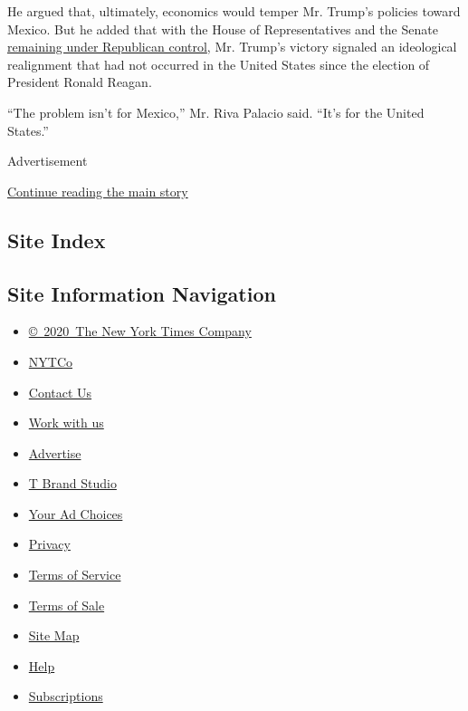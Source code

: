 He argued that, ultimately, economics would temper Mr. Trump's policies
toward Mexico. But he added that with the House of Representatives and
the Senate
\href{http://www.nytimes3xbfgragh.onion/2016/11/09/us/politics/republican-senate.html?action=Click\&contentCollection=BreakingNews\&contentID=64523551\&pgtype=article}{remaining
under Republican control}, Mr. Trump's victory signaled an ideological
realignment that had not occurred in the United States since the
election of President Ronald Reagan.

``The problem isn't for Mexico,'' Mr. Riva Palacio said. ``It's for the
United States.''

Advertisement

\protect\hyperlink{after-bottom}{Continue reading the main story}

\hypertarget{site-index}{%
\subsection{Site Index}\label{site-index}}

\hypertarget{site-information-navigation}{%
\subsection{Site Information
Navigation}\label{site-information-navigation}}

\begin{itemize}
\tightlist
\item
  \href{https://help.nytimes3xbfgragh.onion/hc/en-us/articles/115014792127-Copyright-notice}{©~2020~The
  New York Times Company}
\end{itemize}

\begin{itemize}
\tightlist
\item
  \href{https://www.nytco.com/}{NYTCo}
\item
  \href{https://help.nytimes3xbfgragh.onion/hc/en-us/articles/115015385887-Contact-Us}{Contact
  Us}
\item
  \href{https://www.nytco.com/careers/}{Work with us}
\item
  \href{https://nytmediakit.com/}{Advertise}
\item
  \href{http://www.tbrandstudio.com/}{T Brand Studio}
\item
  \href{https://www.nytimes3xbfgragh.onion/privacy/cookie-policy\#how-do-i-manage-trackers}{Your
  Ad Choices}
\item
  \href{https://www.nytimes3xbfgragh.onion/privacy}{Privacy}
\item
  \href{https://help.nytimes3xbfgragh.onion/hc/en-us/articles/115014893428-Terms-of-service}{Terms
  of Service}
\item
  \href{https://help.nytimes3xbfgragh.onion/hc/en-us/articles/115014893968-Terms-of-sale}{Terms
  of Sale}
\item
  \href{https://spiderbites.nytimes3xbfgragh.onion}{Site Map}
\item
  \href{https://help.nytimes3xbfgragh.onion/hc/en-us}{Help}
\item
  \href{https://www.nytimes3xbfgragh.onion/subscription?campaignId=37WXW}{Subscriptions}
\end{itemize}
